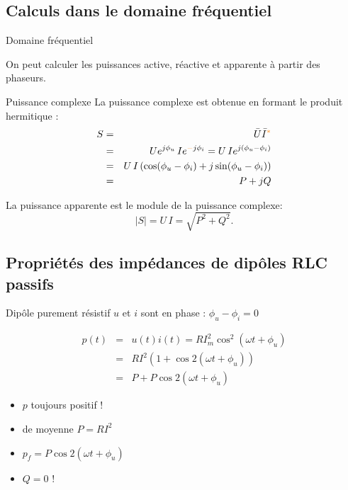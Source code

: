 	\subsection{Calculs dans le domaine fréquentiel}
	\begin{frame}{Domaine fréquentiel}
		
		On peut calculer les puissances active, réactive et apparente à partir des phaseurs. 
		
		\begin{block}{Puissance complexe}
		La puissance complexe est obtenue en formant le produit \alert{hermitique} :
		\begin{eqnarray*}
			S&=&\bar{U}\bar{I}^{\mathcolor{orange}{*}}\\
			& = & Ue^{j\phi_u}\,Ie^{{\mathcolor{orange}{-}}j\phi_i}= U\, Ie^{j(\phi_u-\phi_i)}\\
			& = & U\,I \left(\cos(\phi_u-\phi_i)+j\sin(\phi_u-\phi_i)\right)\\
			& = & P + j Q			
		\end{eqnarray*}
	\end{block}
	
	La puissance apparente est le module de la puissance complexe:
	$$|S|=U\,I=\sqrt{P^2+Q^2}.$$

	\end{frame}
	
\subsection{Propriétés des impédances de dipôles RLC passifs}	
	\begin{frame}{Dipôle purement résistif}
		$u$ et $i$ sont en phase : $\phi_u-\phi_i=0$
		
		\begin{eqnarray*}
			p(t)& = &u(t)i(t)=RI_m^2\cos^2(\omega t + \phi_u)\\
			& =& RI^2(1+\cos 2(\omega t + \phi_u))\\
			& = & P + P \cos 2(\omega t+ \phi_u)
		\end{eqnarray*}
		
		\begin{itemize}
		\item $p$ toujours positif !
		\item de moyenne $P=RI^2$
		\item $p_f= P \cos 2(\omega t+ \phi_u)$
		\item $Q=0$ !
		\end{itemize}

	\end{frame}
	
